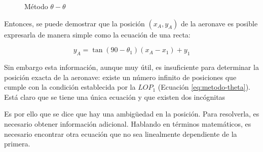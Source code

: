 \begin{figure}[!h]
  \centering
  \caption{M\'etodo $\theta-\theta$}
\end{figure}

Entonces, se puede demostrar que la posici\'on $(x_A, y_A)$ de la aeronave es posible expresarla de manera simple como la ecuaci\'on de una recta:


\begin{equation}\label{eq:metodo-theta}
 y_A = \tan (90-\theta_1) (x_A-x_1) + y_1
 \end{equation}





Sin embargo esta informaci\'on, aunque muy \'util, es insuficiente para determinar la posici\'on exacta de la aeronave: existe un n\'umero infinito de posiciones que cumple con la condici\'on establecida por la $LOP_{1}$ (Ecuaci\'on \ref{eq:metodo-theta}). Est\'a claro que se tiene una \'unica ecuaci\'on y que existen dos inc\'ognitas

Es por ello que se dice que hay una ambigüedad en la posici\'on. Para resolverla, es necesario obtener informaci\'on adicional. Hablando en t\'erminos matem\'aticos, es necesario encontrar otra ecuaci\'on que no sea linealmente dependiente de la primera.

